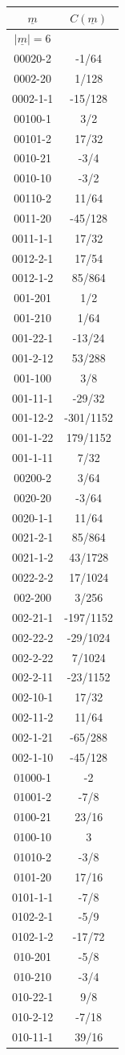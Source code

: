 \begin{tabular}[t]{|cc|}
\hline
$\underline{m}$ & $C(\underline{m})$\\
\hline\hline
$|\underline{m}|=6$&\\
\hline
00020-2 &  -1/64\\
0002-20 &  1/128\\
0002-1-1 &  -15/128\\
00100-1 &  3/2\\
00101-2 &  17/32\\
0010-21 &  -3/4\\
0010-10 &  -3/2\\
00110-2 &  11/64\\
0011-20 &  -45/128\\
0011-1-1 &  17/32\\
0012-2-1 &  17/54\\
0012-1-2 &  85/864\\
001-201 &  1/2\\
001-210 &  1/64\\
001-22-1 &  -13/24\\
001-2-12 &  53/288\\
001-100 &  3/8\\
001-11-1 &  -29/32\\
001-12-2 &  -301/1152\\
001-1-22 &  179/1152\\
001-1-11 &  7/32\\
00200-2 &  3/64\\
0020-20 &  -3/64\\
0020-1-1 &  11/64\\
0021-2-1 &  85/864\\
0021-1-2 &  43/1728\\
0022-2-2 &  17/1024\\
002-200 &  3/256\\
002-21-1 &  -197/1152\\
002-22-2 &  -29/1024\\
002-2-22 &  7/1024\\
002-2-11 &  -23/1152\\
002-10-1 &  17/32\\
002-11-2 &  11/64\\
002-1-21 &  -65/288\\
002-1-10 &  -45/128\\
01000-1 &  -2\\
01001-2 &  -7/8\\
0100-21 &  23/16\\
0100-10 &  3\\
01010-2 &  -3/8\\
0101-20 &  17/16\\
0101-1-1 &  -7/8\\
0102-2-1 &  -5/9\\
0102-1-2 &  -17/72\\
010-201 &  -5/8\\
010-210 &  -3/4\\
010-22-1 &  9/8\\
010-2-12 &  -7/18\\
010-11-1 &  39/16\\
\hline
\end{tabular}
